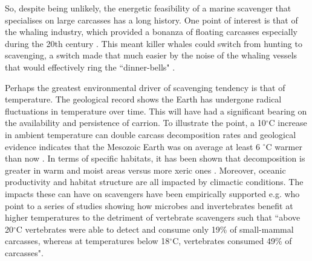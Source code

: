 \documentclass[a4paper,12pt]{article}
\begin{document}
So, despite being unlikely, the energetic feasibility of a marine scavenger that specialises on large carcasses has a long history.
One point of interest is that of the whaling industry, which provided a bonanza of floating carcasses especially during the 20th century \citep{Whitehead415}.
This meant killer whales could switch from hunting to scavenging, a switch made that much easier by the noise of the whaling vessels that would effectively ring the ``dinner-bells" \citep{Whitehead415}.

Perhaps the greatest environmental driver of scavenging tendency is that of temperature. 
The geological record shows the Earth has undergone radical fluctuations in temperature over time.
This will have had a significant bearing on the availability and persistence of carrion.
To illustrate the point, a 10$^{\circ}$C increase in ambient temperature can double carcass decomposition rates \citep{parmenter2009carrion} and geological evidence indicates that the Mesozoic Earth was on average at least 6 $^{\circ}$C warmer than now \citep{sellwood2006mesozoic}.
In terms of specific habitats, it has been shown that decomposition is greater in warm and moist areas versus more xeric ones \citep{beasley2015vertebrates}.
Moreover, oceanic productivity and habitat structure are all impacted by climactic conditions.
The impacts these can have on scavengers have been empirically supported e.g. \cite{beasley2015vertebrates} who point to a series of studies showing how microbes and invertebrates benefit at higher temperatures to the detriment of vertebrate scavengers such that ``above 20$^{\circ}$C vertebrates were able to detect and consume only 19\% of small-mammal carcasses, whereas at temperatures below 18$^{\circ}$C, vertebrates consumed 49\% of carcasses".


\end{document}
